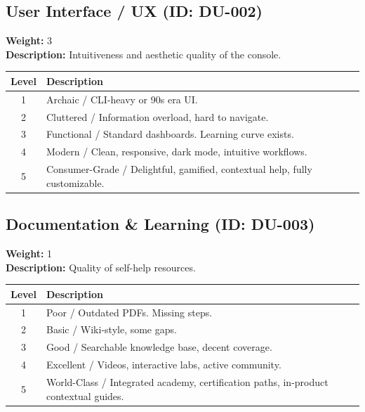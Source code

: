 \documentclass{article}
\begin{document}
\subsection{User Interface / UX (ID: DU-002)}
\textbf{Weight:} 3 \\
\textbf{Description:} Intuitiveness and aesthetic quality of the console.
\vspace{0.3cm}
\begin{longtable}{|c|p{12cm}|}
\hline
\rowcolor{lightgray} \textbf{Level} & \textbf{Description} \\ \hline
1 & Archaic / CLI-heavy or 90s era UI. \\ \hline
2 & Cluttered / Information overload, hard to navigate. \\ \hline
3 & Functional / Standard dashboards. Learning curve exists. \\ \hline
4 & Modern / Clean, responsive, dark mode, intuitive workflows. \\ \hline
5 & Consumer-Grade / Delightful, gamified, contextual help, fully customizable. \\ \hline
\end{longtable}
\vspace{0.5cm}
\subsection{Documentation \& Learning (ID: DU-003)}
\textbf{Weight:} 1 \\
\textbf{Description:} Quality of self-help resources.
\vspace{0.3cm}
\begin{longtable}{|c|p{12cm}|}
\hline
\rowcolor{lightgray} \textbf{Level} & \textbf{Description} \\ \hline
1 & Poor / Outdated PDFs. Missing steps. \\ \hline
2 & Basic / Wiki-style, some gaps. \\ \hline
3 & Good / Searchable knowledge base, decent coverage. \\ \hline
4 & Excellent / Videos, interactive labs, active community. \\ \hline
5 & World-Class / Integrated academy, certification paths, in-product contextual guides. \\ \hline
\end{longtable}
\vspace{0.5cm}
\end{document}
